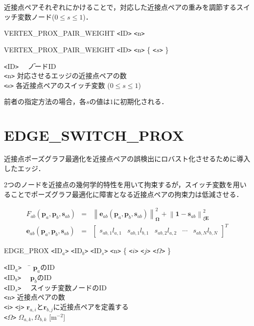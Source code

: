 \documentclass[dvipdfmx]{jsarticle}
\begin{document}
近接点ペアそれぞれにかけることで，対応した近接点ペアの重みを調節するスイッチ変数ノード($0\le s\le 1$)．

VERTEX\_PROX\_PAIR\_WEIGHT \verb|<|ID\verb|>| \verb|<|n\verb|>|

VERTEX\_PROX\_PAIR\_WEIGHT \verb|<|ID\verb|>| \verb|<|n\verb|>| \{ \verb|<|$s$\verb|>| \}

\begin{tabbing}
	\verb|<|ID\verb|>|　 	\= ノードID \\
	\verb|<|n\verb|>| 		\> 対応させるエッジの近接点ペアの数 \\
	\verb|<|s\verb|>| 		\> 各近接点ペアのスイッチ変数 ($0\le s\le 1$)
\end{tabbing}

前者の指定方法の場合，各$s$の値は$1$に初期化される．

\section{EDGE\_SWITCH\_PROX}
近接点ポーズグラフ最適化を近接点ペアの誤検出にロバスト化させるために導入したエッジ．

2つのノードを近接点の幾何学的特性を用いて拘束するが，スイッチ変数を用いることでポーズグラフ最適化に障害となる近接点ペアの拘束力は低減させる．

\begin{eqnarray}
	F_{ab} \left( \bm{p}_a, \bm{p}_b, \bm{s}_{ab} \right) &=& \left\| \bm{e}_{ab} \left( \bm{p}_a, \bm{p}_b, \bm{s}_{ab} \right) \right\|_{\bm{\Omega}}^2 + \left\| \bm{1} - \bm{s}_{ab} \right\|_{\xi \bm{E}}^2 \\
	\bm{e}_{ab} \left( \bm{p}_a, \bm{p}_b, \bm{s}_{ab} \right) &=& \left[ \begin{array}{ccccc}
		s_{ab,1} l_{a,1} & s_{ab,1} l_{b,1} & s_{ab,2} l_{a,2} & \cdots & s_{ab,N} l_{b,N}
	\end{array} \right]^T
\end{eqnarray}

EDGE\_PROX \verb|<|ID$_a$\verb|>| \verb|<|ID$_b$\verb|>| \verb|<|ID$_s$\verb|>| \verb|<|n\verb|>| \{ \verb|<|$i$\verb|>| \verb|<|$j$\verb|>| \verb|<|$\Omega$\verb|>| \}

\begin{tabbing}
	\verb|<|ID$_a$\verb|>|　						\= $\bm{p}_a$のID \\
	\verb|<|ID$_b$\verb|>|　 						\> $\bm{p}_b$のID \\
	\verb|<|ID$_s$\verb|>|　 						\> スイッチ変数ノードのID \\
	\verb|<|n\verb|>| 							\> 近接点ペアの数 \\
	\verb|<|i\verb|>| \verb|<|j\verb|>|				\> $\bm{r}_{a,i}$と$\bm{r}_{b,j}$に近接点ペアを定義する \\
	\verb|<|$\Omega$\verb|>|					\> $\Omega_{a,k}, \Omega_{b,k}$ [m$^{-2}$]
\end{tabbing}
\end{document}
